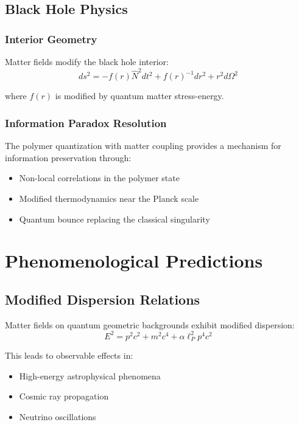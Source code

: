 \documentclass[11pt]{article}
\begin{document}
\subsection{Black Hole Physics}

\subsubsection{Interior Geometry}
Matter fields modify the black hole interior:
\begin{equation}
ds^2 = -f(r)\hat{N}^2 dt^2 + f(r)^{-1} dr^2 + r^2 d\Omega^2
\end{equation}

where $f(r)$ is modified by quantum matter stress-energy.

\subsubsection{Information Paradox Resolution}
The polymer quantization with matter coupling provides a mechanism for information preservation through:
\begin{itemize}
\item Non-local correlations in the polymer state
\item Modified thermodynamics near the Planck scale
\item Quantum bounce replacing the classical singularity
\end{itemize}

\section{Phenomenological Predictions}

\subsection{Modified Dispersion Relations}

Matter fields on quantum geometric backgrounds exhibit modified dispersion:
\begin{equation}
E^2 = p^2 c^2 + m^2 c^4 + \alpha \ell_P^2 p^4 c^2
\end{equation}

This leads to observable effects in:
\begin{itemize}
\item High-energy astrophysical phenomena
\item Cosmic ray propagation
\item Neutrino oscillations
\end{itemize}
\end{document}
